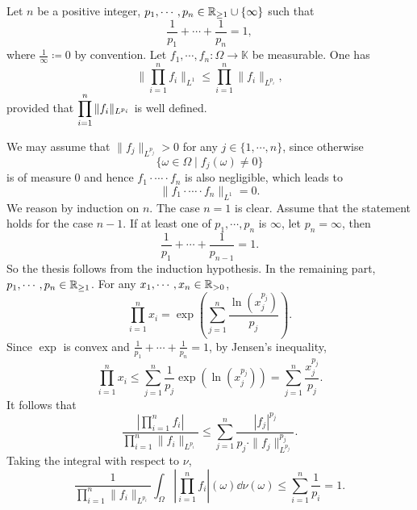 \begin{theoremenv}
    Let $n$ be a positive integer, $p_1,\cdots,p_n \in \mathbb{R}_{\ge 1} \cup \{\infty\}$ such that
    $$\frac{1}{p_1} + \cdots + \frac{1}{p_n} = 1,$$
    where $\frac{1}{\infty} \coloneq 0$ by convention.
    Let $f_1,\cdots,f_n : \Omega \longrightarrow \mathbb{K}$ be measurable.
    One has
    $$\|\prod_{i=1}^{n}f_i\|_{L^{1}} \le \prod_{i = 1}^n \|f_i\|_{L^{p_i}},$$
    provided that $\displaystyle \prod_{i = 1}^n \|f_i\|_{L^{p_i}}$ is well defined.
\end{theoremenv}
\begin{proofenv}
    We may assume that $\|f_{j}\|_{L^{p_j}} > 0$ for any $j \in \{1,\cdots,n\}$, since otherwise
    $$\{\omega \in \Omega \mid f_{j} (\omega) \neq 0\}$$
    is of measure $0$ and hence $f_1 \cdot \cdots \cdot f_n$ is also negligible, which leads to
    $$\|f_1 \cdot \cdots \cdot f_n\|_{L^{1}} = 0.$$
    We reason by induction on $n$.
    The case $n=1$ is clear.
    Assume that the statement holds for the case $n-1$. If at least one of $p_1, \cdots, p_n$ is $\infty$, let $p_n = \infty$, then
    $$\frac{1}{p_1} + \cdots + \frac{1}{p_{n-1}} = 1.$$
    So the thesis follows from the induction hypothesis.
    In the remaining part, $p_1,\cdots,p_n \in \mathbb{R}_{\ge 1}$.
    For any $x_1,\cdots,x_n \in \mathbb{R}_{>0}$,
    $$\prod_{i = 1}^{n} x_i = \exp \left(\sum_{j = 1}^{n} \frac{\ln(x_j^{p_j})}{p_j}\right).$$
    Since $\exp$ is convex and $\frac{1}{p_1} + \cdots + \frac{1}{p_n} = 1$, by Jensen's inequality,
    $$\prod_{i = 1}^{n} x_i \le \sum_{j = 1}^{n} \frac{1}{p_j} \exp\left(\ln(x_j^{p_j})\right) = \sum_{j=1}^{n} \frac{x_j^{p_j}}{p_j}.$$
    It follows that
    $$\frac{|\prod_{i=1}^{n} f_i|}{\prod_{i=1}^{n}\|f_i\|_{L^{p_i}}} \le \sum_{j=1}^{n} \frac{|f_j|^{p_j}}{p_j \cdot \|f_j\|^{p_j}_{L^{p_j}}}.$$
    Taking the integral with respect to $\nu$,
    $$\frac{1}{\prod_{i=1}^{n} \|f_i\|_{L^{p_i}}} \int_{\Omega} |\prod_{i=1}^{n} f_i| (\omega) \dd \nu(\omega) \le \sum_{i=1}^{n}\frac{1}{p_i} = 1.$$
\end{proofenv}

